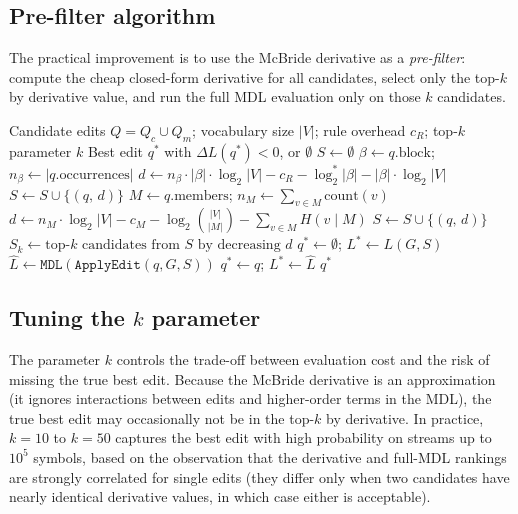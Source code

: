 \documentclass[11pt]{article}
\begin{document}
\subsection{Pre-filter algorithm}

The practical improvement is to use the McBride derivative as a \emph{pre-filter}: compute the cheap closed-form derivative for all candidates, select only the top-$k$ by derivative value, and run the full MDL evaluation only on those $k$ candidates.

\begin{algorithm}
\caption{Derivative-pre-filtered proposal selection}
\label{alg:prefilter}
\begin{algorithmic}[1]
\Require Candidate edits $Q = Q_c \cup Q_m$; vocabulary size $|V|$; rule overhead $c_R$; top-$k$ parameter $k$
\Ensure Best edit $q^*$ with $\Delta L(q^*) < 0$, or $\emptyset$
\State $S \gets \emptyset$ 
  \State $\beta \gets q.\text{block}$; $n_\beta \gets |q.\text{occurrences}|$
  \State $d \gets n_\beta \cdot |\beta| \cdot \log_2 |V| - c_R - \log_2^* |\beta| - |\beta| \cdot \log_2 |V|$
  \State $S \gets S \cup \{(q,\, d)\}$
\EndFor
{}
  \State $M \gets q.\text{members}$; $n_M \gets \sum_{v \in M} \text{count}(v)$
  \State $d \gets n_M \cdot \log_2 |V| - c_M - \log_2 \binom{|V|}{|M|} - \sum_{v \in M} H(v \mid M)$
  \State $S \gets S \cup \{(q,\, d)\}$
\EndFor
\State $S_k \gets \text{top-}k \text{ candidates from } S \text{ by decreasing } d$
\State $q^* \gets \emptyset$; $L^* \gets L(G, S)$
  \State $\hat{L} \gets \texttt{MDL}(\texttt{ApplyEdit}(q, G, S))$ 
    \State $q^* \gets q$; $L^* \gets \hat{L}$
  \EndIf
\EndFor
\State \Return $q^*$
\end{algorithmic}
\end{algorithm}

\subsection{Tuning the $k$ parameter}

The parameter $k$ controls the trade-off between evaluation cost and the risk of missing the true best edit.  Because the McBride derivative is an approximation (it ignores interactions between edits and higher-order terms in the MDL), the true best edit may occasionally not be in the top-$k$ by derivative.  In practice, $k = 10$ to $k = 50$ captures the best edit with high probability on streams up to $10^5$ symbols, based on the observation that the derivative and full-MDL rankings are strongly correlated for single edits (they differ only when two candidates have nearly identical derivative values, in which case either is acceptable).
\end{document}
